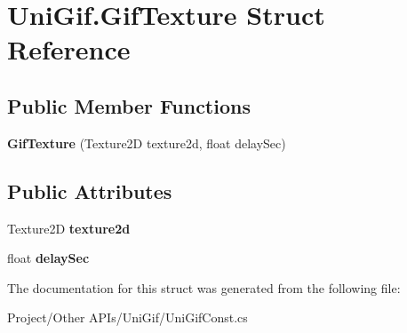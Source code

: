 \hypertarget{struct_uni_gif_1_1_gif_texture}{}\section{Uni\+Gif.\+Gif\+Texture Struct Reference}
\label{struct_uni_gif_1_1_gif_texture}
\subsection*{Public Member Functions}
\begin{DoxyCompactItemize}
\item 
\mbox{\label{struct_uni_gif_1_1_gif_texture_a1e46beef96f4ceb278e1a6430837fda1}} 
{\bfseries Gif\+Texture} (Texture2D texture2d, float delay\+Sec)
\end{DoxyCompactItemize}
\subsection*{Public Attributes}
\begin{DoxyCompactItemize}
\item 
\mbox{\label{struct_uni_gif_1_1_gif_texture_a29f6af15d9586257ed3bf7592189f416}} 
Texture2D {\bfseries texture2d}
\item 
\mbox{\label{struct_uni_gif_1_1_gif_texture_a319318dbe2d1f2d8ad53e4125e658f54}} 
float {\bfseries delay\+Sec}
\end{DoxyCompactItemize}


The documentation for this struct was generated from the following file\+:\begin{DoxyCompactItemize}
\item 
Project/\+Other A\+P\+Is/\+Uni\+Gif/Uni\+Gif\+Const.\+cs\end{DoxyCompactItemize}
